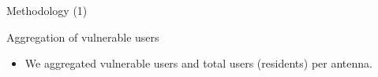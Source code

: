 \documentclass{beamer}
\begin{document}
\begin{frame}{Methodology (1)}
\begin{block}{Aggregation of vulnerable users}
\begin{itemize}

			\item  We aggregated vulnerable users and total users (residents) per antenna.


		\end{itemize}
	\end{block}
\end{frame}
\end{document}
